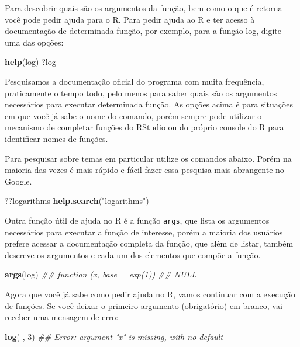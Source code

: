 \documentclass[
  11pt,
  a5paper,
  openany]{book}
\newenvironment{Shaded}{\begin{snugshade}}{\end{snugshade}}
\newcommand{\CommentTok}[1]{\textcolor[rgb]{0.56,0.35,0.01}{\textit{#1}}}
\newcommand{\DecValTok}[1]{\textcolor[rgb]{0.00,0.00,0.81}{#1}}
\newcommand{\KeywordTok}[1]{\textcolor[rgb]{0.13,0.29,0.53}{\textbf{#1}}}
\newcommand{\NormalTok}[1]{#1}
\newcommand{\StringTok}[1]{\textcolor[rgb]{0.31,0.60,0.02}{#1}}
\begin{document}
Para descobrir quais são os argumentos da função, bem como o que é retorna você pode pedir ajuda para o R. Para pedir ajuda ao R e ter acesso à documentação de determinada função, por exemplo, para a função log, digite uma das opções:

\begin{Shaded}
\begin{Highlighting}[]
\KeywordTok{help}\NormalTok{(log)           }
\NormalTok{?log}
\end{Highlighting}
\end{Shaded}

Pesquisamos a documentação oficial do programa com muita frequência, praticamente o tempo todo, pelo menos para saber quais são os argumentos necessários para executar determinada função. As opções acima é para situações em que você já sabe o nome do comando, porém sempre pode utilizar o mecanismo de completar funções do RStudio ou do próprio console do R para identificar nomes de funções.

Para pesquisar sobre temas em particular utilize os comandos abaixo. Porém na maioria das vezes é mais rápido e fácil fazer essa pesquisa mais abrangente no Google.

\begin{Shaded}
\begin{Highlighting}[]
\NormalTok{??logarithms}
\KeywordTok{help.search}\NormalTok{(}\StringTok{"logarithms"}\NormalTok{)}
\end{Highlighting}
\end{Shaded}

Outra função útil de ajuda no R é a função \texttt{args}, que lista os argumentos necessários para executar a função de interesse, porém a maioria dos usuários prefere acessar a documentação completa da função, que além de listar, também descreve os argumentos e cada um dos elementos que compõe a função.

\begin{Shaded}
\begin{Highlighting}[]
\KeywordTok{args}\NormalTok{(log)}
\CommentTok{## function (x, base = exp(1)) }
\CommentTok{##   NULL}
\end{Highlighting}
\end{Shaded}

Agora que você já sabe como pedir ajuda no R, vamos continuar com a execução de funções. Se você deixar o primeiro argumento (obrigatório) em branco, vai receber uma mensagem de erro:

\begin{Shaded}
\begin{Highlighting}[]
\KeywordTok{log}\NormalTok{( , }\DecValTok{3}\NormalTok{)}
\CommentTok{## Error: argument "x" is missing, with no default}
\end{Highlighting}
\end{Shaded}
\end{document}
